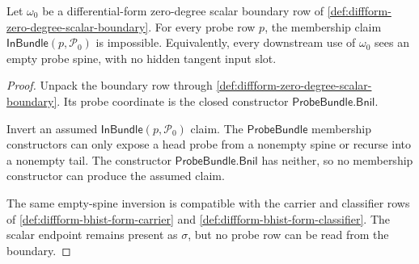 \begin{theorem}
\label{thm:diffform-zero-degree-empty-probe-exhaustion}
Let $\omega_0$ be a differential-form zero-degree scalar boundary row of
\autoref{def:diffform-zero-degree-scalar-boundary}. For every probe row $p$,
the membership claim $\mathsf{InBundle}(p,\mathcal{P}_0)$ is impossible.
Equivalently, every downstream use of $\omega_0$ sees an empty probe spine,
with no hidden tangent input slot.
\end{theorem}
\begin{proof}
Unpack the boundary row through
\autoref{def:diffform-zero-degree-scalar-boundary}. Its probe coordinate is
the closed constructor $\mathsf{ProbeBundle.Bnil}$.

Invert an assumed $\mathsf{InBundle}(p,\mathcal{P}_0)$ claim. The
$\mathsf{ProbeBundle}$ membership constructors can only expose a head probe
from a nonempty spine or recurse into a nonempty tail. The constructor
$\mathsf{ProbeBundle.Bnil}$ has neither, so no membership constructor can
produce the assumed claim.

The same empty-spine inversion is compatible with the carrier and classifier
rows of \autoref{def:diffform-bhist-form-carrier} and
\autoref{def:diffform-bhist-form-classifier}. The scalar endpoint remains
present as $\sigma$, but no probe row can be read from the boundary.
\end{proof}

